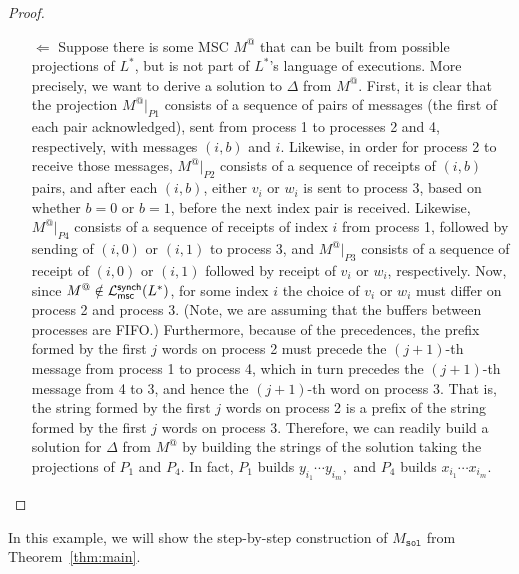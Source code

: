 \begin{proof}
\begin{itemize}
		\item[$\Leftarrow$]
			Suppose there is some MSC $M^@$ that can be built from possible 
			projections of $L^*$, but is not part of $L^*$'s language
			of executions. 
			More precisely, we want to derive a solution to $\Delta$ from $M^@$.
			First, it is clear that the projection $M^@|_{P1}$ consists of a sequence
			of pairs of messages (the first of each pair acknowledged), sent from
			process 1 to processes 2 and 4, respectively, with messages $(i, b)$ and $i$.
			Likewise, in order for process 2 to receive those messages,
			$M^@|_{P2}$ consists of a sequence of receipts of $(i, b)$ pairs, and after
			each $(i, b)$, either $v_i$ or $w_i$ is sent to process 3, based on whether
			$b = 0$ or $b = 1$, before the next index pair is received.
			Likewise, $M^@|_{P4}$ consists of a sequence of receipts of index $i$ from
			process 1, followed by sending of $(i, 0)$ or $(i, 1)$ to process 3, and
			$M^@|_{P3}$ consists of a sequence of receipt of $(i, 0)$ or $(i, 1)$ followed
			by receipt of $v_i$ or $w_i$, respectively.
			Now, since $M^@\notin \mathcal{L}_{\mathsf{msc}}^{\mathsf{synch}}(L^*)$, for some index $i$ the choice of $v_i$ or
			$w_i$ must differ on process 2 and process 3. (Note, we are assuming that
			the buffers between processes are FIFO.)
			Furthermore, because of the precedences, the prefix formed by the first
			$j$ words on process 2 must precede the $(j + 1)$-th message from
			process 1 to process 4, which in turn precedes the $(j + 1)$-th message
			from 4 to 3, and hence the $(j + 1)$-th word on process 3. That is, the
			string formed by the first $j$ words on process 2 is a prefix of the string
			formed by the first $j$ words on process 3. Therefore, we can readily
			build a solution for $\Delta$ from $M^@$ by building the strings of the solution
			taking the projections of $P_1$ and $P_4$. In fact, $P_1$ builds 
			$y_{i_1}\cdots y_{i_m},$ and $P_4$ builds $x_{i_1}\cdots x_{i_m}$.

	\end{itemize}

\end{proof}

In this example, we will show the step-by-step construction 
of $M_{\texttt{sol}}$ from Theorem~\ref{thm:main}.

\bigskip

